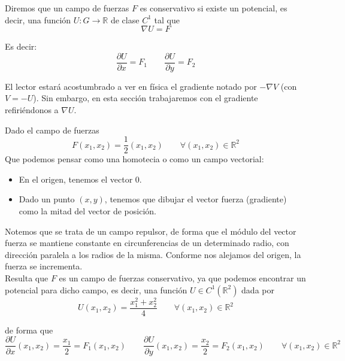 \begin{definicion}
    Diremos que un campo de fuerzas $F$ es conservativo si existe un potencial, es decir, una función $U:G\rightarrow\mathbb{R}$ de clase $C^1$ tal que 
    \begin{equation*}
        \nabla U = F
    \end{equation*}

    Es decir:
    \begin{equation*}
        \dfrac{\partial U}{\partial x} = F_1 \qquad \dfrac{\partial U}{\partial y} = F_2
    \end{equation*}
\end{definicion}
\begin{observacion}
    El lector estará acostumbrado a ver en física el gradiente notado por $-\nabla V$ (con $V = -U$). Sin embargo, en esta sección trabajaremos con el gradiente refiriéndonos a $\nabla U$.
\end{observacion}

\begin{ejemplo}
    Dado el campo de fuerzas
    \begin{equation*}
        F(x_1,x_2) = \dfrac{1}{2}(x_1,x_2) \qquad \forall (x_1,x_2)\in \mathbb{R}^2
    \end{equation*}
    Que podemos pensar como una homotecia o como un campo vectorial:
    \begin{itemize}
        \item En el origen, tenemos el vector 0.
        \item Dado un punto $(x,y)$, tenemos que dibujar el vector fuerza (gradiente) como la mitad del vector de posición.
    \end{itemize}
    Notemos que se trata de un campo repulsor, de forma que el módulo del vector fuerza se mantiene constante en circunferencias de un determinado radio, con dirección paralela a los radios de la misma. Conforme nos alejamos del origen, la fuerza se incrementa.\\

    Resulta que $F$ es un campo de fuerzas conservativo, ya que podemos encontrar un potencial para dicho campo, es decir, una función $U\in C^1(\mathbb{R}^2)$ dada por
    \begin{equation*}
        U(x_1,x_2) = \dfrac{x_1^2 + x_2^2}{4} \qquad \forall (x_1,x_2)\in \mathbb{R}^2
    \end{equation*}

    de forma que
    \begin{equation*}
        \dfrac{\partial U}{\partial x}(x_1,x_2) = \dfrac{x_1}{2}= F_1(x_1,x_2) \qquad \dfrac{\partial U}{\partial y}(x_1,x_2) = \dfrac{x_2}{2} = F_2(x_1,x_2) \qquad \forall (x_1,x_2) \in \mathbb{R}^2
    \end{equation*}
\end{ejemplo}

